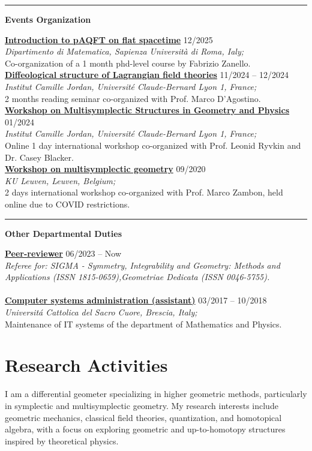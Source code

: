\documentclass[a4paper]{article}
\newcommand{\block}[1]{\hrule \vspace{0.2cm} \textbf{\Large #1} \vspace{0.2cm}}
\newcommand{\voice}[5]{\href{#4}{\textbf{#1}} \hfill #2 \\ \textit{#3} \\ {\small #5} \vspace{0.2cm} \\}
\newcommand{\txt}[1]{#1\\}
\begin{document}
	\block{Events Organization}

    \voice{Introduction to pAQFT on flat spacetime}
        {12/2025}
        {Dipartimento di Matematica, Sapienza Università di Roma, Ialy;}
        {https://www.antoniomiti.it/teaching/aqft-2025/}       
        {Co-organization of a 1 month phd-level course by Fabrizio Zanello.}	
	\voice{Diffeological structure of Lagrangian field theories}
		{11/2024 -- 12/2024}
		{Institut Camille Jordan, Université Claude-Bernard Lyon 1, France;}
		{https://www.antoniomiti.it/teaching/LFT-2024/}       
		{2 months reading seminar co-organized with Prof. Marco D'Agostino.}
	\voice{Workshop on Multisymplectic Structures in Geometry and Physics}
		{01/2024}
		{Institut Camille Jordan, Université Claude-Bernard Lyon 1, France;}
		{https://math.gmu.edu/~cblacke/lyon.html}       
		{Online 1 day international workshop co-organized with Prof. Leonid Ryvkin and Dr. Casey Blacker.}
	\voice{Workshop on multisymplectic geometry}
		{09/2020}
		{KU Leuven, Leuven, Belgium;}
		{https://wis.kuleuven.be/events/multisymplectic}       
		{2 days international workshop co-organized with Prof. Marco Zambon, held online due to COVID restrictions.}

	\block{Other Departmental Duties}

	\voice{Peer-reviewer}
		{06/2023 -- Now}
		{Referee for: SIGMA - Symmetry, Integrability and Geometry: Methods and Applications (ISSN 1815-0659),Geometriae Dedicata (ISSN 0046-5755).}
		{}
        {\vspace{-0.5cm}}
	\voice{Computer systems administration (assistant)}
		{03/2017 -- 10/2018}
		{Universit\'a Cattolica del Sacro Cuore, Brescia, Italy;}
		{https://dipartimenti.unicatt.it/dmf-home}       
		{Maintenance of IT systems of the department of Mathematics and Physics.}

	\clearpage
	\section*{Research Activities}

	\txt{I am a differential geometer specializing in higher geometric methods, particularly in symplectic and multisymplectic geometry. My research interests include geometric mechanics, classical field theories, quantization, and homotopical algebra, with a focus on exploring geometric and up-to-homotopy structures inspired by theoretical physics. }
	
\end{document}
